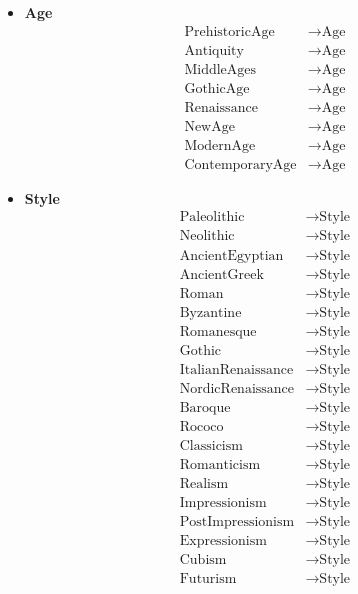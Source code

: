 \documentclass[a4paper, 11pt]{article}
\begin{document}
\begin{itemize}
  \item \textbf{Age}
    \begin{align*}
      \text{PrehistoricAge} &\to \text{Age}\\
      \text{Antiquity} &\to \text{Age}\\
      \text{MiddleAges} &\to \text{Age}\\
      \text{GothicAge} &\to \text{Age}\\
      \text{Renaissance} &\to \text{Age}\\
      \text{NewAge} &\to \text{Age}\\
      \text{ModernAge} &\to \text{Age}\\
      \text{ContemporaryAge} &\to \text{Age}
    \end{align*}
  \item \textbf{Style}
    \begin{align*}
      \text{Paleolithic} &\to \text{Style}\\
      \text{Neolithic} &\to \text{Style}\\
      \text{AncientEgyptian} &\to \text{Style}\\
      \text{AncientGreek} &\to \text{Style}\\
      \text{Roman} &\to \text{Style}\\
      \text{Byzantine} &\to \text{Style}\\
      \text{Romanesque} &\to \text{Style}\\
      \text{Gothic} &\to \text{Style}\\
      \text{ItalianRenaissance} &\to \text{Style}\\
      \text{NordicRenaissance} &\to \text{Style}\\
      \text{Baroque} &\to \text{Style}\\
      \text{Rococo} &\to \text{Style}\\
      \text{Classicism} &\to \text{Style}\\
      \text{Romanticism} &\to \text{Style}\\
      \text{Realism} &\to \text{Style}\\
      \text{Impressionism} &\to \text{Style}\\
      \text{PostImpressionism} &\to \text{Style}\\
      \text{Expressionism} &\to \text{Style}\\
      \text{Cubism} &\to \text{Style}\\
      \text{Futurism} &\to \text{Style}\\

\end{align*}
\end{itemize}
\end{document}
